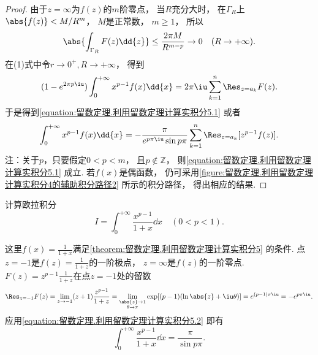 \begin{theorem}
\begin{proof}
由于\(z=\infty\)为\(f(z)\)的\(m\)阶零点，
当\(R\)充分大时，
在\(\Gamma_R\)上\(\abs{f(z)}<M/R^m\)，
\(M\)是正常数，
\(m\geq1\)，
所以\begin{equation*}
	\abs{\int_{\Gamma_R} F(z) \dd{z}}
	\leq \frac{2\pi M}{R^{m-p}} \to0\quad(R\to+\infty).
\end{equation*}
在(1)式中令\(r\to0^+,R\to+\infty\)，
得到\begin{equation*}
	(1-e^{2\pi p\iu}) \int_0^{+\infty} x^{p-1} f(x) \dd{x}
	= 2\pi\iu \sum_{k=1}^n \Res_{z=a_k} F(z).
\end{equation*}
于是得到\cref{equation:留数定理.利用留数定理计算实积分5.1}
或者\begin{equation}\label{equation:留数定理.利用留数定理计算实积分5.2}
	\int_0^{+\infty} x^{p-1} f(x) \dd{x}
	= -\frac{\pi}{e^{p\pi\iu} \sin p\pi} \sum_{k=1}^n \Res_{z=a_k}[z^{p-1} f(z)].
\end{equation}
注：关于\(p\)，只要假定\(0<p<m\)，
且\(p\notin\mathbb{Z}\)，
则\cref{equation:留数定理.利用留数定理计算实积分5.1} 成立.
若\(f(x)\)是偶函数，
仍可采用\cref{figure:留数定理.利用留数定理计算实积分4的辅助积分路径2} 所示的积分路径，
得出相应的结果.
\end{proof}
\end{theorem}

\begin{example}
计算欧拉积分\begin{equation*}
	I = \int_0^{+\infty} \frac{x^{p-1}}{1+x} \dd{x} \quad(0<p<1).
\end{equation*}
\begin{solution}
这里\(f(x) = \frac{1}{1+x}\)满足\cref{theorem:留数定理.利用留数定理计算实积分5} 的条件.
点\(z=-1\)是\(f(z) = \frac{1}{1+z}\)的一阶极点，
\(z=\infty\)是\(f(z)\)的一阶零点.
\(F(z) = z^{p-1} \frac{1}{1+z}\)在点\(z=-1\)处的留数\begin{equation*}
	\Res_{z=-1} F(z)
	= \lim_{z\to-1} (z+1) \frac{z^{p-1}}{1+z}
	= \lim_{\substack{\abs{z}\to1 \\ \theta\to\pi}} \exp[(p-1)(\ln\abs{z}+\iu\theta)]
	= e^{(p-1)\pi\iu}
	= -e^{p\pi\iu}.
\end{equation*}
应用\cref{equation:留数定理.利用留数定理计算实积分5.2}
即有\begin{equation}
	\int_0^{+\infty} \frac{x^{p-1}}{1+x} \dd{x} = \frac{\pi}{\sin p\pi}.
\end{equation}
\end{solution}
\end{example}

